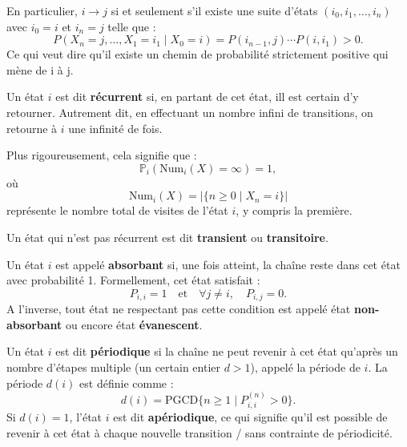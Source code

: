 \documentclass{article}
\begin{document}
En particulier, $i \to j$ si et seulement s'il existe une suite d'états $(i_0, i_1, \dots, i_n)$ avec $i_0 = i$ et $i_n = j$ telle que :
\[
P(X_n = j, \dots, X_1 = i_1 \mid X_0 = i) = P(i_{n-1}, j) \cdots P(i, i_1) > 0.
\]
Ce qui veut dire qu'il existe un chemin de probabilité strictement positive qui mène de i à j.

\begin{tcolorbox}[colback=white,colframe=blue!80!black,title=État récurrent/transitoire]
Un état $i$ est dit \textbf{récurrent} si, en partant de cet état, ill est certain d'y retourner.
Autrement dit, en effectuant un nombre infini de transitions, on retourne à $i$ une infinité de fois.

Plus rigoureusement, cela signifie que :
\[
\mathbb{P}_i(\text{Num}_i(X) = \infty) = 1,
\]
où  
\[
\text{Num}_i(X) = |\{n \geq 0 \mid X_n = i\}|
\]
représente le nombre total de visites de l'état $i$, y compris la première.

Un état qui n'est pas récurrent est dit \textbf{transient} ou \textbf{transitoire}.
\end{tcolorbox}

\begin{tcolorbox}[colback=white,colframe=blue!80!black,title=État absorbant/évanescent]
Un état $i$ est appelé \textbf{absorbant} si, une fois atteint, la chaîne reste dans cet état avec probabilité 1. Formellement, cet état satisfait :
\[
P_{i,i} = 1 \quad \text{et} \quad \forall j \neq i, \quad P_{i,j} = 0.
\]
A l'inverse, tout état ne respectant pas cette condition est appelé état \textbf{non-absorbant} ou encore état \textbf{évanescent}.
\end{tcolorbox}

\begin{tcolorbox}[colback=white,colframe=blue!80!black,title=État périodique/apériodique]
Un état $i$ est dit \textbf{périodique} si la chaîne ne peut revenir à cet état qu'après un nombre d'étapes multiple (un certain entier $d > 1$), appelé la période de $i$. La période $d(i)$ est définie comme :
\[
d(i) = \text{PGCD}\{n \geq 1 \mid P_{i,i}^{(n)} > 0\}.
\]
Si $d(i) = 1$, l'état $i$ est dit \textbf{apériodique}, ce qui signifie qu'il est possible de revenir à cet état à chaque nouvelle transition /  sans contrainte de périodicité.
\end{tcolorbox}

\end{document}
